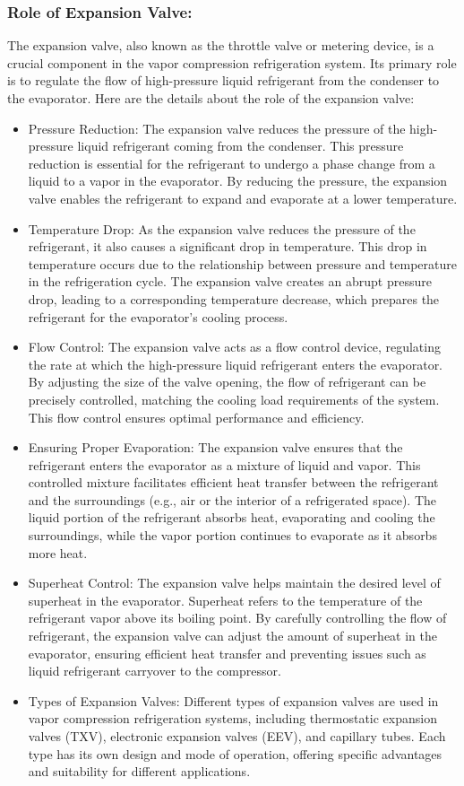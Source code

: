 \documentclass{article}
\begin{document}
\subsubsection*{Role of Expansion Valve:}
The expansion valve, also known as the throttle valve or metering device, is a crucial component in the vapor compression refrigeration system. Its primary role is to regulate the flow of high-pressure liquid refrigerant from the condenser to the evaporator. Here are the details about the role of the expansion valve:

\begin{itemize}
  \item Pressure Reduction: The expansion valve reduces the pressure of the high-pressure liquid refrigerant coming from the condenser. This pressure reduction is essential for the refrigerant to undergo a phase change from a liquid to a vapor in the evaporator. By reducing the pressure, the expansion valve enables the refrigerant to expand and evaporate at a lower temperature.
  \item Temperature Drop: As the expansion valve reduces the pressure of the refrigerant, it also causes a significant drop in temperature. This drop in temperature occurs due to the relationship between pressure and temperature in the refrigeration cycle. The expansion valve creates an abrupt pressure drop, leading to a corresponding temperature decrease, which prepares the refrigerant for the evaporator's cooling process.
  \item Flow Control: The expansion valve acts as a flow control device, regulating the rate at which the high-pressure liquid refrigerant enters the evaporator. By adjusting the size of the valve opening, the flow of refrigerant can be precisely controlled, matching the cooling load requirements of the system. This flow control ensures optimal performance and efficiency.
  \item Ensuring Proper Evaporation: The expansion valve ensures that the refrigerant enters the evaporator as a mixture of liquid and vapor. This controlled mixture facilitates efficient heat transfer between the refrigerant and the surroundings (e.g., air or the interior of a refrigerated space). The liquid portion of the refrigerant absorbs heat, evaporating and cooling the surroundings, while the vapor portion continues to evaporate as it absorbs more heat.
  \item Superheat Control: The expansion valve helps maintain the desired level of superheat in the evaporator. Superheat refers to the temperature of the refrigerant vapor above its boiling point. By carefully controlling the flow of refrigerant, the expansion valve can adjust the amount of superheat in the evaporator, ensuring efficient heat transfer and preventing issues such as liquid refrigerant carryover to the compressor.
  \item Types of Expansion Valves: Different types of expansion valves are used in vapor compression refrigeration systems, including thermostatic expansion valves (TXV), electronic expansion valves (EEV), and capillary tubes. Each type has its own design and mode of operation, offering specific advantages and suitability for different applications.
\end{itemize}
\end{document}
